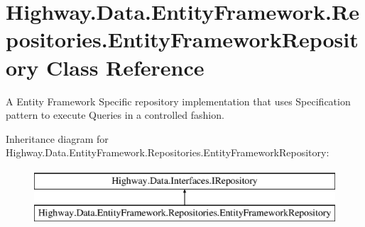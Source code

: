 \hypertarget{class_highway_1_1_data_1_1_entity_framework_1_1_repositories_1_1_entity_framework_repository}{\section{Highway.\-Data.\-Entity\-Framework.\-Repositories.\-Entity\-Framework\-Repository Class Reference}
\label{class_highway_1_1_data_1_1_entity_framework_1_1_repositories_1_1_entity_framework_repository}
}


A Entity Framework Specific repository implementation that uses Specification pattern to execute Queries in a controlled fashion.  


Inheritance diagram for Highway.\-Data.\-Entity\-Framework.\-Repositories.\-Entity\-Framework\-Repository\-:\begin{figure}[H]
\begin{center}
\leavevmode
\includegraphics[height=2.000000cm]{class_highway_1_1_data_1_1_entity_framework_1_1_repositories_1_1_entity_framework_repository}
\end{center}
\end{figure}

